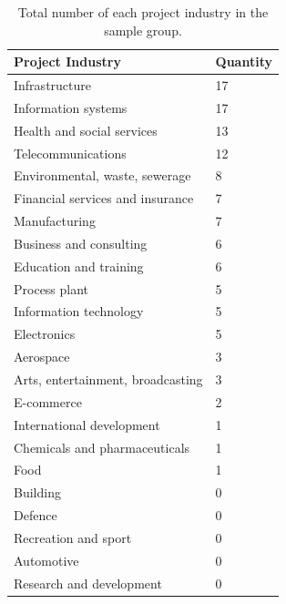 \begin{table}[!hbt]
\centering
\captionsetup{font=small}
\footnotesize
    \begin{tabular}{|l|l|}
    \hline
    Project Industry                  & Quantity \\ \hline
    Infrastructure                    & 17       \\
    Information systems               & 17       \\
    Health and social services        & 13       \\
    Telecommunications                & 12       \\
    Environmental, waste, sewerage    & 8        \\
    Financial services and insurance  & 7        \\
    Manufacturing                     & 7        \\
    Business and consulting           & 6        \\
    Education and training            & 6        \\
    Process plant                     & 5        \\
    Information technology            & 5        \\
    Electronics                       & 5        \\
    Aerospace                         & 3        \\
    Arts, entertainment, broadcasting & 3        \\
    E-commerce                        & 2        \\
    International development         & 1        \\
    Chemicals and pharmaceuticals     & 1        \\
    Food                              & 1        \\
    Building                          & 0        \\
    Defence                           & 0        \\
    Recreation and sport              & 0        \\
    Automotive                        & 0        \\
    Research and development          & 0     \\ \hline  
    \end{tabular}
    \caption[Total number of each project industry in sample group]{Total number of each project industry in the sample group.}
    \label{tab:studyindu}
\end{table}




